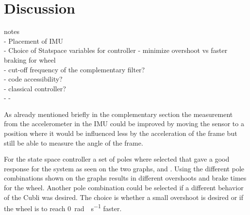\chapter{Discussion}

{\Large notes} \\
- Placement of IMU\\
- Choice of Statspace variables for controller - minimize overshoot vs faster braking for wheel\\
- cut-off frequency of the complementary filter?\\
- code accessibility?\\
- classical controller?\\
- 
- 


As already mentioned briefly in the complementary section the measurement from the accelerometer in the IMU could be improved by moving the sensor to a position where it would be influenced less by the acceleration of the frame but still be able to measure the angle of the frame. 

For the state space controller a set of poles where selected that gave a good response for the system as seen on the two graphs,  and . Using the different pole combinations shown on the graphs results in different overshoots and brake times for the wheel. Another pole combination could be selected if a different behavior of the Cubli was desired. The choice is whether a small overshoot is desired or if the wheel is to reach \SI{0}{rad\cdot s^{-1}} faster.

